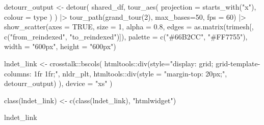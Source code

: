 \documentclass[
  11pt,
  a4paper,
]{report}
\newenvironment{Shaded}{\begin{snugshade}}{\end{snugshade}}
\newcommand{\AttributeTok}[1]{\textcolor[rgb]{0.40,0.45,0.13}{#1}}
\newcommand{\ConstantTok}[1]{\textcolor[rgb]{0.56,0.35,0.01}{#1}}
\newcommand{\DecValTok}[1]{\textcolor[rgb]{0.68,0.00,0.00}{#1}}
\newcommand{\FloatTok}[1]{\textcolor[rgb]{0.68,0.00,0.00}{#1}}
\newcommand{\FunctionTok}[1]{\textcolor[rgb]{0.28,0.35,0.67}{#1}}
\newcommand{\NormalTok}[1]{\textcolor[rgb]{0.00,0.23,0.31}{#1}}
\newcommand{\OtherTok}[1]{\textcolor[rgb]{0.00,0.23,0.31}{#1}}
\newcommand{\SpecialCharTok}[1]{\textcolor[rgb]{0.37,0.37,0.37}{#1}}
\newcommand{\StringTok}[1]{\textcolor[rgb]{0.13,0.47,0.30}{#1}}
\begin{document}
\begin{Shaded}
\begin{Highlighting}[]
\NormalTok{detourr\_output }\OtherTok{\textless{}{-}} \FunctionTok{detour}\NormalTok{(}
\NormalTok{  shared\_df,}
  \FunctionTok{tour\_aes}\NormalTok{(}
    \AttributeTok{projection =} \FunctionTok{starts\_with}\NormalTok{(}\StringTok{"x"}\NormalTok{),}
    \AttributeTok{colour =}\NormalTok{ type}
\NormalTok{  )}
\NormalTok{) }\SpecialCharTok{|\textgreater{}}
  \FunctionTok{tour\_path}\NormalTok{(}\FunctionTok{grand\_tour}\NormalTok{(}\DecValTok{2}\NormalTok{), }
                    \AttributeTok{max\_bases=}\DecValTok{50}\NormalTok{, }\AttributeTok{fps =} \DecValTok{60}\NormalTok{) }\SpecialCharTok{|\textgreater{}}
  \FunctionTok{show\_scatter}\NormalTok{(}\AttributeTok{axes =} \ConstantTok{TRUE}\NormalTok{, }\AttributeTok{size =} \DecValTok{1}\NormalTok{, }\AttributeTok{alpha =} \FloatTok{0.8}\NormalTok{, }
               \AttributeTok{edges =} \FunctionTok{as.matrix}\NormalTok{(trimesh[, }\FunctionTok{c}\NormalTok{(}\StringTok{"from\_reindexed"}\NormalTok{, }\StringTok{"to\_reindexed"}\NormalTok{)]),}
               \AttributeTok{palette =} \FunctionTok{c}\NormalTok{(}\StringTok{"\#66B2CC"}\NormalTok{, }\StringTok{"\#FF7755"}\NormalTok{),}
                \AttributeTok{width =} \StringTok{"600px"}\NormalTok{, }\AttributeTok{height =} \StringTok{"600px"}\NormalTok{)}
\end{Highlighting}
\end{Shaded}

\begin{Shaded}
\begin{Highlighting}[]
\NormalTok{lndet\_link }\OtherTok{\textless{}{-}}\NormalTok{ crosstalk}\SpecialCharTok{::}\FunctionTok{bscols}\NormalTok{(}
\NormalTok{    htmltools}\SpecialCharTok{::}\FunctionTok{div}\NormalTok{(}\AttributeTok{style=}\StringTok{"display: grid; grid{-}template{-}columns: 1fr 1fr;"}\NormalTok{,}
\NormalTok{                   nldr\_plt,}
\NormalTok{                   htmltools}\SpecialCharTok{::}\FunctionTok{div}\NormalTok{(}\AttributeTok{style =} \StringTok{"margin{-}top: 20px;"}\NormalTok{, detourr\_output)}
\NormalTok{    ),}
    \AttributeTok{device =} \StringTok{"xs"}
\NormalTok{  )}


\FunctionTok{class}\NormalTok{(lndet\_link) }\OtherTok{\textless{}{-}} \FunctionTok{c}\NormalTok{(}\FunctionTok{class}\NormalTok{(lndet\_link), }\StringTok{"htmlwidget"}\NormalTok{)}

\NormalTok{lndet\_link}
\end{Highlighting}
\end{Shaded}
\end{document}
